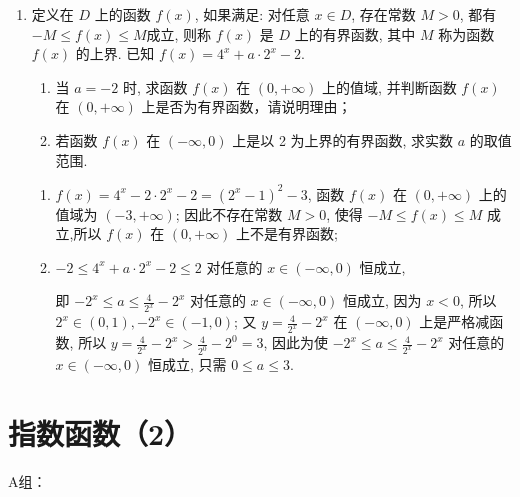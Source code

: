 \begin{enumerate}
\item 定义在 $D$ 上的函数 $f(x)$, 如果满足: 对任意 $x \in D$, 存在常数 $M>0$, 都有 $-M \leq f(x) \leq M$成立, 则称 $f(x)$ 是 $D$ 上的有界函数, 其中 $M$ 称为函数 $f(x)$ 的上界. 已知 $f(x)=4^x+a \cdot 2^x-2$.
\begin{enumerate}
\item 当 $a=-2$ 时, 求函数 $f(x)$ 在 $(0,+\infty)$ 上的值域, 并判断函数 $f(x)$ 在 $(0,+\infty)$ 上是否为有界函数，请说明理由；
\item 若函数 $f(x)$ 在 $(-\infty, 0)$ 上是以 2 为上界的有界函数, 求实数 $a$ 的取值范围.
\end{enumerate}
\begin{jieda}
\begin{enumerate}
\item $f(x)=4^x-2 \cdot 2^x-2=\left(2^x-1\right)^2-3$, 函数 $f(x)$ 在 $(0,+\infty)$ 上的值域为 $(-3,+\infty)$; 因此不存在常数 $M>0$, 使得 $-M \leq f(x) \leq M$ 成立,所以 $f(x)$ 在 $(0,+\infty)$ 上不是有界函数;
\item  $-2 \leq 4^x+a \cdot 2^x-2 \leq 2$ 对任意的 $x \in(-\infty, 0)$ 恒成立,

即 $-2^x \leq a \leq \frac{4}{2^x}-2^x$ 对任意的 $x \in(-\infty, 0)$ 恒成立,
因为 $x<0$, 所以 $2^x \in(0,1),-2^x \in(-1,0)$;
又 $y=\frac{4}{2^x}-2^x$ 在 $(-\infty, 0)$ 上是严格减函数, 所以 $y=\frac{4}{2^x}-2^x>\frac{4}{2^0}-2^0=3$,
因此为使 $-2^x \leq a \leq \frac{4}{2^x}-2^x$ 对任意的 $x \in(-\infty, 0)$ 恒成立, 只需 $0 \leq a \leq 3$.
\end{enumerate}

\end{jieda}



\end{enumerate}


\section*{指数函数（2）}

A组：

